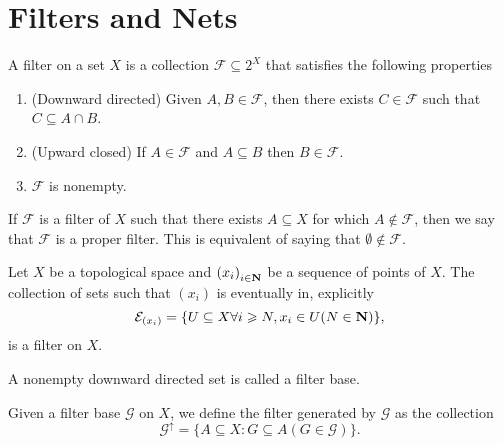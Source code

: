 \section{Filters and Nets}

\begin{definition}\label{def: filter}
  A filter on a set \(X\) is a collection \(\mathcal F \subseteq 2^X\) that
  satisfies the following properties
  \begin{enumerate}[(F1)]
    \item\label{def: filter F1}
      (Downward directed) Given \(A, B \in \mathcal F\), then there exists
      \(C \in \mathcal F\) such that \(C \subseteq A \cap B\).
    \item\label{def: filter F2}
      (Upward closed) If \(A \in \mathcal F\) and \(A \subseteq B\) then \(B
      \in \mathcal F\).
    \item\label{def: filter F3}
      \(\mathcal F\) is nonempty.
  \end{enumerate}
\end{definition}

\begin{definition}
  If \(\mathcal F\) is a filter of \(X\) such that there exists \(A \subseteq
  X\) for which \(A \not\in \mathcal F\), then we say that \(\mathcal F\) is a
  proper filter. This is equivalent of saying that \(\emptyset \not\in \mathcal
  F\).
\end{definition}

\begin{proposition}
  Let \(X\) be a topological space and \({(x_i)}_{i \in \mathbf{N}}\) be a
  sequence of points of \(X\). The collection of sets such that \((x_i)\) is
  eventually in, explicitly
  \[
    \mathcal E_{(x_i)} = \{U \subseteq X \relax \forall i \geqslant N, x_i \in U (N \in
    \mathbf{N})\},
  \]
  is a filter on \(X\).
\end{proposition}

\begin{definition}
  A nonempty downward directed set is called a filter base.
\end{definition}

\begin{proposition}
  Given a filter base \(\mathcal G\) on \(X\), we define the filter generated by
  \(\mathcal G\) as the collection
  \[
    \mathcal G^\uparrow = \{A \subseteq X \colon G \subseteq A (G \in \mathcal G)\}.
  \]
\end{proposition}

